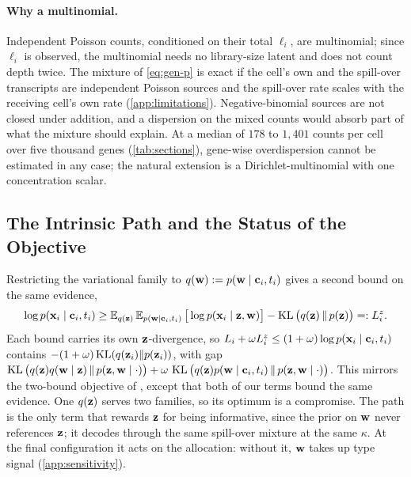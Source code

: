 \paragraph{Why a multinomial.} Independent Poisson counts, conditioned on their total $\ell_i$, are multinomial; since $\ell_i$ is observed, the multinomial needs no library-size latent and does not count depth twice. The mixture of \cref{eq:gen-p} is exact if the cell's own and the spill-over transcripts are independent Poisson sources and the spill-over rate scales with the receiving cell's own rate (\cref{app:limitations}). Negative-binomial sources are not closed under addition, and a dispersion on the mixed counts would absorb part of what the mixture should explain. At a median of $178$ to $1{,}401$ counts per cell over five thousand genes (\cref{tab:sections}), gene-wise overdispersion cannot be estimated in any case; the natural extension is a Dirichlet-multinomial with one concentration scalar.

\subsection{The Intrinsic Path and the Status of the Objective}
\label{app:pathb}
\label{app:posterior-reg}

Restricting the variational family to $q(\mathbf{w}) := p(\mathbf{w} \mid \mathbf{c}_i, t_i)$ gives a second bound on the same evidence,
\begin{equation*}
  \log p(\mathbf{x}_i \mid \mathbf{c}_i, t_i) \geq \operatorname{\mathbb{E}}_{q(\mathbf{z})}\operatorname{\mathbb{E}}_{p(\mathbf{w} \mid \mathbf{c}_i, t_i)}\big[\log p(\mathbf{x}_i \mid \mathbf{z}, \mathbf{w})\big] - \operatorname{KL}\big(q(\mathbf{z})\,\|\,p(\mathbf{z})\big) =: L_i^{z}.
\end{equation*}
Each bound carries its own $\mathbf{z}$-divergence, so $L_i + \omega L_i^{z} \le (1+\omega)\log p(\mathbf{x}_i \mid \mathbf{c}_i, t_i)$ contains $-(1+\omega)\operatorname{KL}(q(\mathbf{z}_i)\|p(\mathbf{z}_i))$, with gap $\operatorname{KL}\big(q(\mathbf{z})q(\mathbf{w} \mid \mathbf{z})\,\|\,p(\mathbf{z},\mathbf{w} \mid \cdot)\big) + \omega\,\operatorname{KL}\big(q(\mathbf{z})p(\mathbf{w} \mid \mathbf{c}_i,t_i)\,\|\,p(\mathbf{z},\mathbf{w} \mid \cdot)\big)$. This mirrors the two-bound objective of \citet{slavutsky2025}, except that both of our terms bound the same evidence. One $q(\mathbf{z})$ serves two families, so its optimum is a compromise. The path is the only term that rewards $\mathbf{z}$ for being informative, since the prior on $\mathbf{w}$ never references $\mathbf{z}$; it decodes through the same spill-over mixture at the same $\kappa$. At the final configuration it acts on the allocation: without it, $\mathbf{w}$ takes up type signal (\cref{app:sensitivity}).

